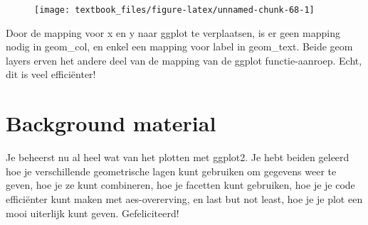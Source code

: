 \documentclass[]{tufte-book}
\newenvironment{Shaded}{}{}
\newcommand{\DataTypeTok}[1]{\textcolor[rgb]{0.56,0.13,0.00}{#1}}
\newcommand{\DecValTok}[1]{\textcolor[rgb]{0.25,0.63,0.44}{#1}}
\newcommand{\KeywordTok}[1]{\textcolor[rgb]{0.00,0.44,0.13}{\textbf{#1}}}
\newcommand{\NormalTok}[1]{#1}
\newcommand{\OperatorTok}[1]{\textcolor[rgb]{0.40,0.40,0.40}{#1}}
\newcommand{\StringTok}[1]{\textcolor[rgb]{0.25,0.44,0.63}{#1}}
\begin{document}
\begin{Shaded}
\end{Shaded}

\begin{figure}
\texttt{[image: textbook\_files/figure-latex/unnamed-chunk-68-1]} \end{figure}

Door de mapping voor x en y naar ggplot te verplaatsen, is er geen mapping nodig in geom\_col, en enkel een mapping voor label in geom\_text. Beide geom layers erven het andere deel van de mapping van de ggplot functie-aanroep. Echt, dit is veel efficiënter!

\hypertarget{background-material}{%
\section{Background material}\label{background-material}}

Je beheerst nu al heel wat van het plotten met ggplot2. Je hebt beiden geleerd hoe je verschillende geometrische lagen kunt gebruiken om gegevens weer te geven, hoe je ze kunt combineren, hoe je facetten kunt gebruiken, hoe je je code efficiënter kunt maken met aes-overerving, en last but not least, hoe je je plot een mooi uiterlijk kunt geven. Gefeliciteerd!
\end{document}
